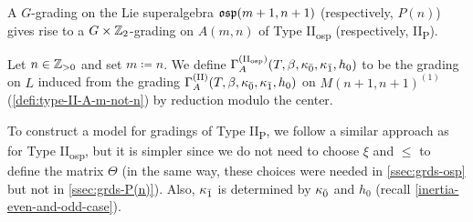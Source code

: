 \begin{remark}
    A $G$-grading on the Lie superalgebra $\mathfrak{osp}(m+1,n+1)$ (respectively, $P(n)$) gives rise to a $G \times \mathbb{Z}_2$-grading on $A(m,n)$ of Type II\textsubscript{osp} (respectively, II\textsubscript{P}). 
\end{remark}

\begin{defi}\label{def:type-II-osp}
    Let $n\in \mathbb{Z}_{> 0}$ and set $m \coloneqq n$. 
    We define $\Gamma^{\mathrm{(II_{osp})}}_A(T, \beta, \kappa_{\bar{0}}, \kappa_{\bar{1}}, h_0)$ to be the grading on $L$ induced from the grading $\Gamma^{\mathrm{(II)}}_A(T, \beta, \kappa_{\bar{0}}, \kappa_{\bar{1}}, h_0)$ on $M(n+1, n+1)^{(1)}$ (\cref{defi:type-II-A-m-not-n}) by reduction modulo the center.
\end{defi}

To construct a model for gradings of Type II\textsubscript{P}, we follow a similar approach as for Type II\textsubscript{osp}, but it is simpler since we do not need to choose $\xi$ and $\leq$ to define the matrix $\Theta$ (in the same way, these choices were needed in \cref{ssec:grds-osp} but not in \cref{ssec:grds-P(n)}). 
Also, $\kappa_{\bar{1}}$ is determined by $\kappa_{\bar{0}}$ and $h_0$ (recall \cref{inertia-even-and-odd-case}).

